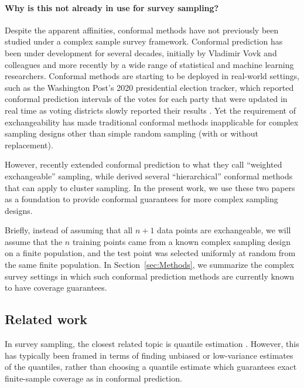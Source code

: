 \documentclass[10.5pt, letterpaper]{article}
\numberwithin{table}{section}
\numberwithin{figure}{section}
\numberwithin{equation}{section}
\begin{document}
\paragraph{Why is this not already in use for survey sampling?}
Despite the apparent affinities, conformal methods have not previously been studied under a complex sample survey framework. Conformal prediction has been under development for several decades, initially by Vladimir Vovk and colleagues \citep{vovk2005algorithmic} and more recently by a wide range of statistical and machine learning researchers. Conformal methods are starting to be deployed in real-world settings, such as the Washington Post's 2020 presidential election tracker, which reported conformal prediction intervals of the votes for each party that were updated in real time as voting districts slowly reported their results \citep{cherian2020washington}. Yet the requirement of exchangeability has made traditional conformal methods inapplicable for complex sampling designs other than simple random sampling (with or without replacement).

However, recently \cite{tibshirani2019conformal} extended conformal prediction to what they call ``weighted exchangeable'' sampling, while \cite{dunn2022distribution} derived several ``hierarchical'' conformal methods that can apply to cluster sampling. In the present work, we use these two papers as a foundation to provide conformal guarantees for more complex sampling designs.

Briefly, instead of assuming that all $n+1$ data points are exchangeable, we will assume that the $n$ training points came from a known complex sampling design on a finite population, and the test point was selected uniformly at random from the same finite population. In Section~\ref{sec:Methods}, we summarize the complex survey settings in which such conformal prediction methods are currently known to have coverage guarantees.


\subsection{Related work}

In survey sampling, the closest related topic is quantile estimation \citep{woodruff1952confidence}. However, this has typically been framed in terms of finding unbiased or low-variance estimates of the quantiles, rather than choosing a quantile estimate which guarantees exact finite-sample coverage as in conformal prediction.
\end{document}
